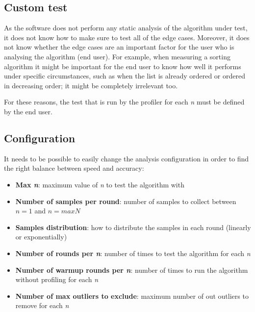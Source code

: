 \subsection{Custom test}
As the software does not perform any static analysis of the algorithm under test, it does not know how to make sure to test all of the edge cases. Moreover, it does not know whether the edge cases are an important factor for the user who is analysing the algorithm (end user). For example, when measuring a sorting algorithm it might be important for the end user to know how well it performs under specific circumstances, such as when the list is already ordered or ordered in decreasing order; it might be completely irrelevant too.

\noindent For these reasons, the test that is run by the profiler for each \emph{n} must be defined by the end user.

\subsection{Configuration}
It needs to be possible to easily change the analysis configuration in order to find the right balance between speed and accuracy:
\begin{itemize}
  \item \textbf{Max \emph{n}}: maximum value of \emph{n} to test the algorithm with
  \item \textbf{Number of samples per round}: number of samples to collect between $n = 1$ and $n = maxN$
  \item \textbf{Samples distribution}: how to distribute the samples in each round (linearly or exponentially)
  \item \textbf{Number of rounds per \emph{n}}: number of times to test the algorithm for each \emph{n}
  \item \textbf{Number of warmup rounds per \emph{n}}: number of times to run the algorithm without profiling for each \emph{n}
  \item \textbf{Number of max outliers to exclude}: maximum number of out outliers to remove for each \emph{n}
\end{itemize}

